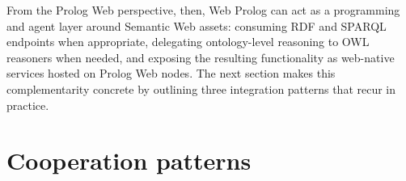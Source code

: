 
From the Prolog Web perspective, then, Web Prolog can act as a programming and agent layer around Semantic Web assets: consuming RDF and SPARQL endpoints when appropriate, delegating ontology-level reasoning to OWL reasoners when needed, and exposing the resulting functionality as web-native services hosted on Prolog Web nodes. The next section makes this complementarity concrete by outlining three integration patterns that recur in practice.


%
%
%



\section{Cooperation patterns}\label{sec:pw-sw-cooperation-patterns}

